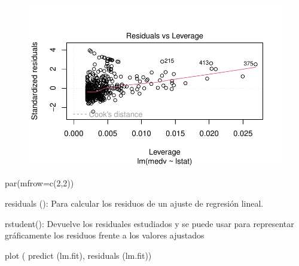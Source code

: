 \documentclass[
  letterpaper,
  DIV=11,
  numbers=noendperiod]{scrartcl}
\newenvironment{Shaded}{\begin{snugshade}}{\end{snugshade}}
\newcommand{\AttributeTok}[1]{\textcolor[rgb]{0.40,0.45,0.13}{#1}}
\newcommand{\DecValTok}[1]{\textcolor[rgb]{0.68,0.00,0.00}{#1}}
\newcommand{\FunctionTok}[1]{\textcolor[rgb]{0.28,0.35,0.67}{#1}}
\newcommand{\NormalTok}[1]{\textcolor[rgb]{0.00,0.23,0.31}{#1}}
\begin{document}
\begin{figure}[H]

{\centering \includegraphics{Resumen-2---3_files/figure-pdf/unnamed-chunk-10-4.pdf}

}

\end{figure}

\begin{Shaded}
\begin{Highlighting}[]
\FunctionTok{par}\NormalTok{(}\AttributeTok{mfrow=}\FunctionTok{c}\NormalTok{(}\DecValTok{2}\NormalTok{,}\DecValTok{2}\NormalTok{))}
\end{Highlighting}
\end{Shaded}

residuals (): Para calcular los residuos de un ajuste de regresión
lineal.

rstudent(): Devuelve los residuales estudiados y se puede usar para
representar gráficamente los residuos frente a los valores ajustados

\begin{Shaded}
\begin{Highlighting}[]
\FunctionTok{plot}\NormalTok{ ( }\FunctionTok{predict}\NormalTok{ (lm.fit), }\FunctionTok{residuals}\NormalTok{ (lm.fit))}
\end{Highlighting}
\end{Shaded}
\end{document}

